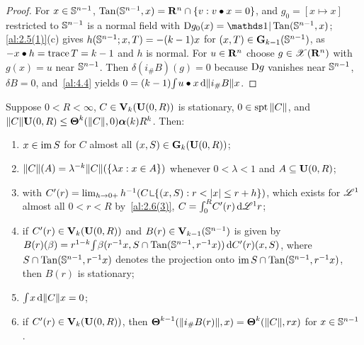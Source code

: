 \begin{proof}
    For $x \in \sphere{\adim-1}$, $\Tan(\sphere{\adim-1},x) = \R^{\adim} \cap \{ v : v \bullet x =
    0 \}$, and $g_0 = [x \mapsto x]$ restricted to $\sphere{\adim-1}$ is a normal field with $\uD
    g_0(x) = \id{}|\Tan(\sphere{\adim-1},x)$; \ref{al:2.5(1)}(c) gives $h(\sphere{\adim-1};x,T) = -
    (\vdim-1) x$ for $(x,T) \in \Gk[\vdim-1]{\sphere{\adim-1}}$, as $- x \bullet h = \trace T =
    \vdim - 1$ and $h$ is normal. For $u \in \R^{\adim}$ choose $g \in \VF(\R^{\adim})$ with $g(x) = u$
    near $\sphere{\adim-1}$. Then $\delta(i_\# B)(g) = 0$ because $\uD g$ vanishes near
    $\sphere{\adim-1}$, $\delta B = 0$, and~\ref{al:4.4} yields $0 = (\vdim - 1) \textint{}{} u
    \bullet x \ud \|i_\# B\| x$.
\end{proof}

\begin{theorem}
    \label{al:5.2(2)}
    Suppose $0 < R < \infty$, $C \in \Var{\vdim}(\oball{0}{R})$ is stationary, $0 \in \spt
    \|C\|$, and $\|C\| \oball{0}{R} \le \density^{\vdim}(\|C\|,0) \unitmeasure{\vdim} R^{\vdim}$.
    Then:
    \begin{enumerate}
        \item $x \in \im S$ for $C$ almost all $(x,S) \in \Gk{\oball{0}{R}}$;
        \item $\|C\|(A) = \lambda^{-\vdim} \|C\|(\{ \lambda x : x \in A \})$ whenever $0 < \lambda <
            1$ and $A \subseteq \oball{0}{R}$;
        \item with $C'(r) = \lim_{h \to 0+} h^{-1} (C \restrict \{ (x,S) : r < |x| \le r + h
            \})$, which exists for $\LM^1$ almost all $0 < r < R$ by~\ref{al:2.6(3)}, $C =
            \textint{0}{R} C'(r) \ud \LM^1 r$;
        \item if $C'(r) \in \Var{\vdim}(\oball{0}{R})$ and $B(r) \in
            \Var{\vdim-1}(\sphere{\adim-1})$ is given by $B(r)(\beta) = r^{1-\vdim} \textint{}{}
            \beta(r^{-1} x, S \cap \Tan(\sphere{\adim-1}, r^{-1} x)) \ud C'(r)(x,S)$, where $S \cap
            \Tan(\sphere{\adim-1},r^{-1}x)$ denotes the projection onto $\im S \cap
            \Tan(\sphere{\adim-1}, r^{-1} x)$, then $B(r)$ is stationary;
        \item $\textint{}{} x \ud \|C\| x = 0$;
        \item if $C'(r) \in \Var{\vdim}(\oball{0}{R})$, then $\density^{\vdim-1}(\|i_\#
            B(r)\|,x) = \density^{\vdim}(\|C\|, r x)$ for $x \in \sphere{\adim-1}$.
    \end{enumerate}
\end{theorem}

